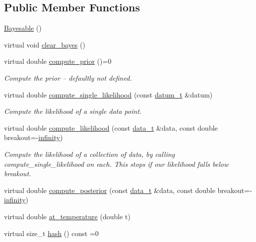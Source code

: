 \subsection*{Public Member Functions}
\begin{DoxyCompactItemize}
\item 
\hyperlink{class_bayesable_aec41e7016c9c1eb6978e1360c23f20cd}{Bayesable} ()
\item 
virtual void \hyperlink{class_bayesable_ac8ab4bb38c8782d2dcd57f3a43a3c605}{clear\+\_\+bayes} ()
\item 
virtual double \hyperlink{class_bayesable_a1b057a17212ced123545133e2297c01b}{compute\+\_\+prior} ()=0
\begin{DoxyCompactList}\small\item\em Compute the prior -- defaultly not defined. \end{DoxyCompactList}\item 
virtual double \hyperlink{class_bayesable_a87d195bfe5cdf6d293dae5fc01ae2e6c}{compute\+\_\+single\+\_\+likelihood} (const \hyperlink{class_bayesable_a9f1a6c0cd7855550fa10b1a8f13a5867}{datum\+\_\+t} \&datum)
\begin{DoxyCompactList}\small\item\em Compute the likelihood of a single data point. \end{DoxyCompactList}\item 
virtual double \hyperlink{class_bayesable_a202493156cec15937bee304d807fdbdb}{compute\+\_\+likelihood} (const \hyperlink{class_bayesable_aa2788c4d7718c0a824e1d28c4c98f921}{data\+\_\+t} \&data, const double breakout=-\/\hyperlink{_numerics_8h_a1bb1e42ae1b40cad6e99da0aab8a5576}{infinity})
\begin{DoxyCompactList}\small\item\em Compute the likelihood of a collection of data, by calling compute\+\_\+single\+\_\+likelihood on each. This stops if our likelihood falls below breakout. \end{DoxyCompactList}\item 
virtual double \hyperlink{class_bayesable_a0b0552923602bcab6c768581ab8c7df8}{compute\+\_\+posterior} (const \hyperlink{class_bayesable_aa2788c4d7718c0a824e1d28c4c98f921}{data\+\_\+t} \&data, const double breakout=-\/\hyperlink{_numerics_8h_a1bb1e42ae1b40cad6e99da0aab8a5576}{infinity})
\item 
virtual double \hyperlink{class_bayesable_acf805473a9eea0df96d6267dca0e9c87}{at\+\_\+temperature} (double t)
\item 
virtual size\+\_\+t \hyperlink{class_bayesable_a26f6d55e7526ebd897cbb27c757b611b}{hash} () const =0

\end{DoxyCompactItemize}
